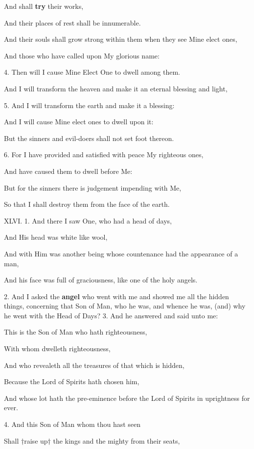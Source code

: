 And shall \textbf{try} their works,

And their places of rest shall be innumerable.

And their souls shall grow strong within them when they see Mine elect ones,

And those who have called upon My glorious name:

4. Then will I cause Mine Elect One to dwell among them.

And I will transform the heaven and make it an eternal blessing and light,

5. And I will transform the earth and make it a blessing:

And I will cause Mine elect ones to dwell upon it:

But the sinners and evil-doers shall not set foot thereon.

6. For I have provided and satisfied with peace My righteous ones,

And have caused them to dwell before Me:

But for the sinners there is judgement impending with Me,

So that I shall destroy them from the face of the earth.


XLVI. 1. And there I saw One, who had a head of days,

And His head was white like wool,

And with Him was another being whose countenance had the appearance of a man,

And his face was full of graciousness, like one of the holy angels.

2. And I asked the \textbf{angel} who went with me and
showed me all the hidden things, concerning that
Son of Man, who he was, and whence he was, (and)
why he went with the Head of Days? 3. And he
answered and said unto me:

This is the Son of Man who hath righteousness,

With whom dwelleth righteousness,

And who revealeth all the treasures of that which is hidden,

Because the Lord of Spirits hath chosen him,

And whose lot hath the pre-eminence before the Lord of Spirits in uprightness for ever.

4. And this Son of Man whom thou hast seen

Shall †raise up† the kings and the mighty from their seats,

